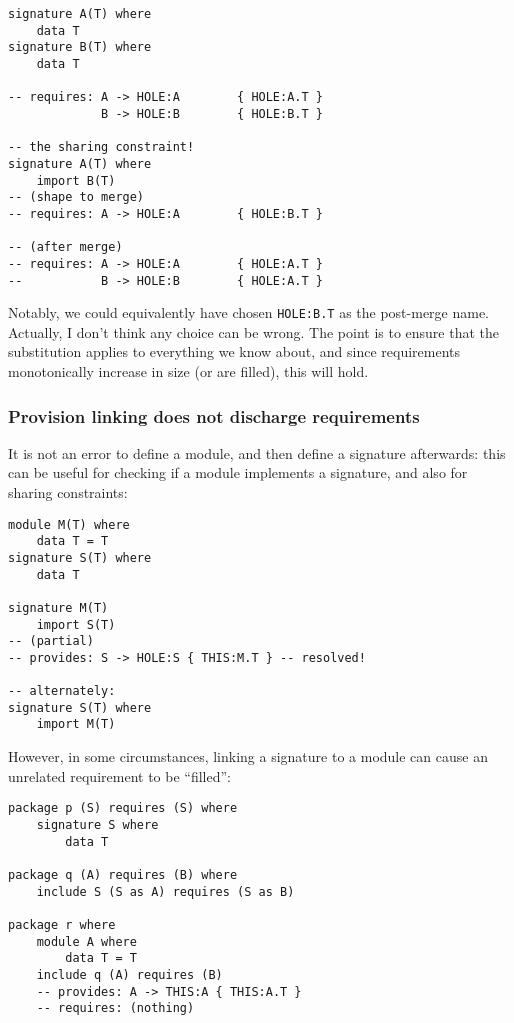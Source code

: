 \documentclass{article}
\newcommand{\Red}[1]{{\color{red} #1}}
\begin{document}
\begin{verbatim}
signature A(T) where
    data T
signature B(T) where
    data T

-- requires: A -> HOLE:A        { HOLE:A.T }
             B -> HOLE:B        { HOLE:B.T }

-- the sharing constraint!
signature A(T) where
    import B(T)
-- (shape to merge)
-- requires: A -> HOLE:A        { HOLE:B.T }

-- (after merge)
-- requires: A -> HOLE:A        { HOLE:A.T }
--           B -> HOLE:B        { HOLE:A.T }
\end{verbatim}

Notably, we could equivalently have chosen \verb|HOLE:B.T| as the post-merge
name.  \Red{Actually, I don't think any choice can be wrong. The point is to
ensure that the substitution applies to everything we know about, and since requirements
monotonically increase in size (or are filled), this will hold.}

\subsubsection{Provision linking does not discharge requirements}

It is not an error to define a module, and then define a signature
afterwards: this can be useful for checking if a module implements
a signature, and also for sharing constraints:

\begin{verbatim}
module M(T) where
    data T = T
signature S(T) where
    data T

signature M(T)
    import S(T)
-- (partial)
-- provides: S -> HOLE:S { THIS:M.T } -- resolved!

-- alternately:
signature S(T) where
    import M(T)
\end{verbatim}

However, in some circumstances, linking a signature to a module can cause an
unrelated requirement to be ``filled'':

\begin{verbatim}
package p (S) requires (S) where
    signature S where
        data T

package q (A) requires (B) where
    include S (S as A) requires (S as B)

package r where
    module A where
        data T = T
    include q (A) requires (B)
    -- provides: A -> THIS:A { THIS:A.T }
    -- requires: (nothing)
\end{verbatim}
\end{document}
